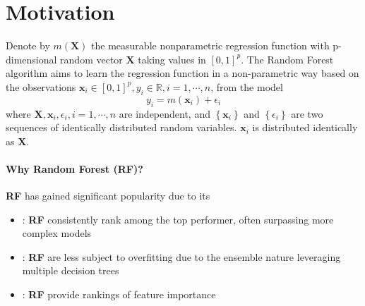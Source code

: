 \documentclass[twoside]{article}
\begin{document}

\section{Motivation}
Denote by $m(\mathbf{X})$ the measurable nonparametric regression function with p-dimensional random vector $\mathbf{X}$ taking values in $[0,1]^p$. The Random Forest algorithm aims to learn the 
regression function in a non-parametric way based on the observations $\mathbf{x}_i \in [0,1]^p,y_i\in\mathbb{R},i=1,\cdots,n$, from the model 
$$
y_i = m(\mathbf{x}_i) + \epsilon_i
$$
where $\mathbf{X},\mathbf{x}_i,\epsilon_i,i=1,\cdots,n$ are independent, and $\left\{\mathbf{x}_i\right\}$ and $\left\{\epsilon_i\right\}$ are two sequences of identically distributed random variables. $\mathbf{x}_i$ is distributed identically as $\mathbf{X}$.

\paragraph*{Why Random Forest (RF)?} \textbf{RF} has gained significant popularity due to its
\begin{itemize}
    \item {}: \textbf{RF} consistently rank among the top performer, often surpassing more complex models
    \item {}: \textbf{RF} are less subject to overfitting due to the ensemble nature leveraging multiple decision trees
    \item {}: \textbf{RF} provide rankings of feature importance
\end{itemize}

\begin{center}
\end{center}

\citet{chi2022asymptotic}

\newpage


\end{document}
